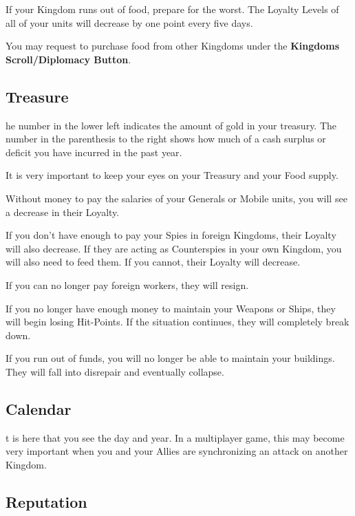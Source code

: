 {If your Kingdom runs out of food, prepare for the worst. The Loyalty Levels of all of your units will decrease by one point every five days.

You may request to purchase food from other Kingdoms under the \textbf{Kingdoms Scroll/Diplomacy Button}.

\subsection{\textsf{Treasure}}


he number in the lower left indicates the amount of gold in your treasury. The number in the parenthesis to the right shows how much of a cash surplus or deficit you have incurred in the past year.

It is very important to keep your eyes on your Treasury and your Food supply.

Without money to pay the salaries of your Generals or Mobile units, you will see a decrease in their Loyalty.


If you don’t have enough to pay your Spies in foreign Kingdoms, their Loyalty will also decrease. If they are acting as Counterspies in your own Kingdom, you will also need to feed them. If you cannot, their Loyalty will decrease.

If you can no longer pay foreign workers, they will resign.

If you no longer have enough money to maintain your Weapons or Ships, they will begin losing Hit-Points. If the situation continues, they will completely break down.

If you run out of funds, you will no longer be able to maintain your buildings. They will fall into disrepair and eventually collapse.

\subsection{Calendar}


t is here that you see the day and year. In a multiplayer game, this may become very important when you and your Allies are synchronizing an attack on another Kingdom.

\subsection{\textsf{Reputation}}

}

